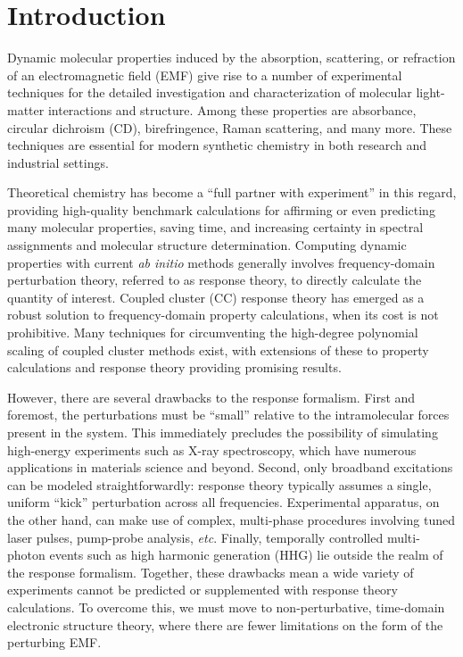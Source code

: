 
\section{Introduction} \label{se:intro} Dynamic molecular properties induced
by the absorption, scattering, or refraction of an electromagnetic field
(EMF) give rise to a number of experimental techniques for the detailed
investigation and characterization of molecular light-matter interactions
and structure.\cite{Barron2004} Among these properties are absorbance,
circular dichroism (CD), birefringence, Raman scattering, and many more.
These techniques are essential for modern synthetic chemistry in both
research and industrial settings.

Theoretical chemistry has become a ``full partner with experiment''
\cite{Goddard1985} in this regard, providing high-quality benchmark
calculations for affirming or even predicting many molecular properties,
saving time, and increasing certainty in spectral assignments and
molecular structure determination. Computing dynamic properties with
current \textit{ab initio} methods generally involves frequency-domain
perturbation theory, referred to as response theory, to directly calculate
the quantity of interest. \cite{Crawford2006,Norman2011,Helgaker2012}
Coupled cluster (CC) response theory\cite{Koch1990,Pedersen1997} has
emerged as a robust solution to frequency-domain property calculations,
when its cost is not prohibitive.\cite{Crawford2018,Crawford2019} Many
techniques for circumventing the high-degree polynomial scaling of
coupled cluster methods exist, with extensions of these to property
calculations and response theory providing promising results.
\cite{McAlexander2016,Kumar2017,Howard2018,DCunha2021}

However, there are several drawbacks to the response
formalism.\cite{Langhoff,Goings2018,Li2020} First and foremost, the
perturbations must be ``small'' relative to the intramolecular forces
present in the system. This immediately precludes the possibility of
simulating high-energy experiments such as X-ray spectroscopy, which
have numerous applications in materials science and beyond. Second,
only broadband excitations can be modeled straightforwardly: response
theory typically assumes a single, uniform ``kick'' perturbation
across all frequencies. Experimental apparatus, on the other hand,
can make use of complex, multi-phase procedures involving tuned laser
pulses, pump-probe analysis, \textit{etc}.\cite{Maiuri2020} Finally,
temporally controlled multi-photon events such as high harmonic generation
(HHG)\cite{Lewenstein1994,Gorlach} lie outside the realm of the response
formalism. Together, these drawbacks mean a wide variety of experiments
cannot be predicted or supplemented with response theory calculations. To
overcome this, we must move to non-perturbative, time-domain electronic
structure theory, \cite{Goings2018,Crawford2019,Li2020} where there are
fewer limitations on the form of the perturbing EMF.

